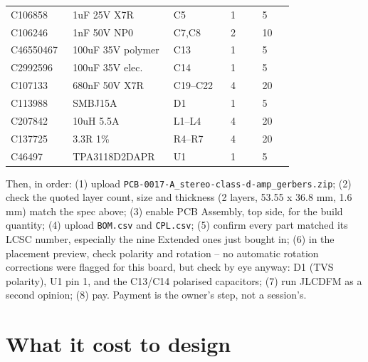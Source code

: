 \begin{hsblock}
\par\vspace{8pt}
{\footnotesize
\begin{tabular}{L{0.15\linewidth} L{0.26\linewidth} L{0.18\linewidth} L{0.10\linewidth} L{0.10\linewidth}}
\hstoprule
{} &  &  &  &  \\
\hline
C106858   & 1uF 25V X7R        & C5           & 1 & 5  \\
C106246   & 1nF 50V NP0        & C7,C8        & 2 & 10 \\
C46550467 & 100uF 35V polymer  & C13          & 1 & 5  \\
C2992596  & 100uF 35V elec.    & C14          & 1 & 5  \\
C107133   & 680nF 50V X7R      & C19--C22     & 4 & 20 \\
C113988   & SMBJ15A            & D1           & 1 & 5  \\
C207842   & 10uH 5.5A          & L1--L4       & 4 & 20 \\
C137725   & 3.3R 1\%           & R4--R7       & 4 & 20 \\
C46497    & TPA3118D2DAPR      & U1           & 1 & 5  \\
\hline
\end{tabular}}
\end{hsblock}

Then, in order: (1) upload
\texttt{PCB-0017-A\_stereo-class-d-amp\_gerbers.zip}; (2) check the quoted layer
count, size and thickness (2 layers, 53.55 x 36.8 mm, 1.6 mm) match the spec
above; (3) enable PCB Assembly, top side, for the build quantity; (4) upload
\texttt{BOM.csv} and \texttt{CPL.csv}; (5) confirm every part matched its
LCSC number, especially the nine Extended ones just bought in; (6) in the
placement preview, check polarity and rotation -- no automatic rotation
corrections were flagged for this board, but check by eye anyway: D1 (TVS
polarity), U1 pin 1, and the C13/C14 polarised capacitors; (7) run JLCDFM as
a second opinion; (8) pay. Payment is the owner's step, not a session's.

\section{What it cost to design}

